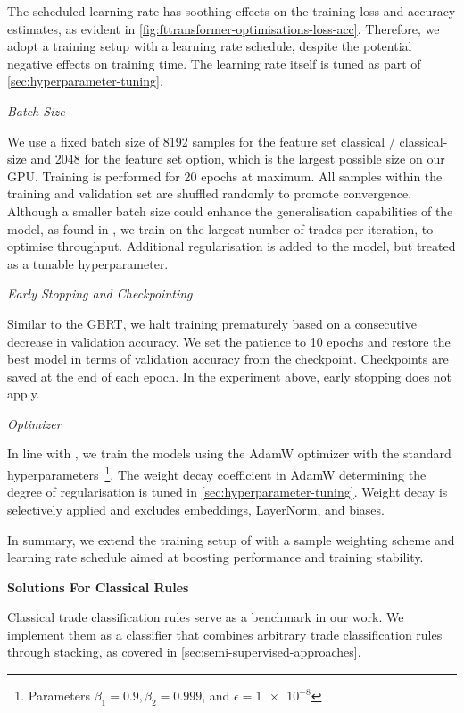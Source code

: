 The scheduled learning rate has soothing effects on the training loss and accuracy estimates, as evident in \cref{fig:fttransformer-optimisations-loss-acc}. Therefore, we adopt a training setup with a learning rate schedule, despite the potential negative effects on training time. The learning rate itself is tuned as part of \cref{sec:hyperparameter-tuning}.


\emph{Batch Size}

We use a fixed batch size of \num{8192} samples for the feature set classical / classical-size and \num{2048} for the feature set option, which is the largest possible size on our \gls{GPU}. Training is performed for \num{20} epochs at maximum. All samples within the training and validation set are shuffled randomly to promote convergence. Although a smaller batch size could enhance the generalisation capabilities of the model, as found in \textcite[][3]{keskarLargeBatchTrainingDeep2017}, we train on the largest number of trades per iteration, to optimise throughput. Additional regularisation is added to the model, but treated as a tunable hyperparameter.

\emph{Early Stopping and Checkpointing}

Similar to the \gls{GBRT}, we halt training prematurely based on a consecutive decrease in validation accuracy. We set the patience to \num{10} epochs and restore the best model in terms of validation accuracy from the checkpoint. Checkpoints are saved at the end of each epoch. In the experiment above, early stopping does not apply.

\emph{Optimizer}

In line with \textcite[][6]{gorishniyRevisitingDeepLearning2021}, we train the models using the AdamW optimizer \autocite[][2--3]{loshchilovDecoupledWeightDecay2019} with the standard hyperparameters~\footnote{Parameters $\beta_{1}=0.9, \beta_{2}=0.999$, and $\epsilon = \num{1e-8}$}. The weight decay coefficient in AdamW determining the degree of regularisation is tuned in \cref{sec:hyperparameter-tuning}. Weight decay is selectively applied and excludes embeddings, LayerNorm, and biases.

In summary, we extend the training setup of \textcite[][6]{gorishniyRevisitingDeepLearning2021} with a sample weighting scheme and learning rate schedule aimed at boosting performance and training stability.

\textbf{Solutions For Classical Rules}

Classical trade classification rules serve as a benchmark in our work. We implement them as a classifier that combines arbitrary trade classification rules through stacking, as covered in \cref{sec:semi-supervised-approaches}.

